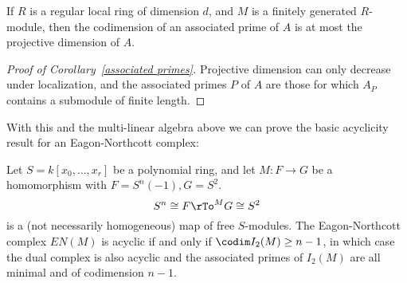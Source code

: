\begin{corollary}\label{associated primes}
If $R$ is a regular local ring of dimension $d$, and $M$ is a finitely generated $R$-module, then the codimension of an associated prime of $A$ is at most the projective dimension of $A$. 
\end{corollary}
\begin{proof}[Proof of  Corollary~\ref{associated primes}]
 Projective dimension can only decrease under localization, and
 the associated primes $P$ of $A$ are those for which $A_{P}$ contains a submodule
 of finite length.
\end{proof}

With this and the multi-linear algebra above we can  prove the basic acyclicity result for an Eagon-Northcott complex:

\begin{proposition}\label{acyclicity}
Let $S = k[x_0,\dots, x_r]$ be a polynomial ring,  and let $M: F\to G$ be a homomorphism with
 $F = S^n(-1), G= S^2$.
 $$
 S^n \cong F \rTo^M G \cong S^2
 $$
 is a (not necessarily homogeneous) map of free $S$-modules.
 The Eagon-Northcott complex $EN(M)$ is acyclic if and only if $\codim I_2(M) \geq n-1$, in which case the dual complex is also acyclic and
 the associated primes of $I_2(M)$ are all minimal and of codimension $n-1$.
 \end{proposition}

